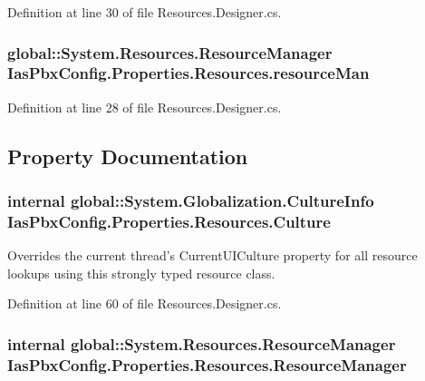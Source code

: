 Definition at line 30 of file Resources.Designer.cs.\hypertarget{class_ias_pbx_config_1_1_properties_1_1_resources_a250bf1e5d02bc97bafed037698f69671}{
\subsubsection[{resourceMan}]{\setlength{\rightskip}{0pt plus 5cm}global::System.Resources.ResourceManager {\bf IasPbxConfig.Properties.Resources.resourceMan}}}
\label{class_ias_pbx_config_1_1_properties_1_1_resources_a250bf1e5d02bc97bafed037698f69671}


Definition at line 28 of file Resources.Designer.cs.

\subsection{Property Documentation}
\hypertarget{class_ias_pbx_config_1_1_properties_1_1_resources_ac86b17b0b60450ffd58d31386fc4fa3b}{
\subsubsection[{Culture}]{\setlength{\rightskip}{0pt plus 5cm}internal global::System.Globalization.CultureInfo IasPbxConfig.Properties.Resources.Culture}}
\label{class_ias_pbx_config_1_1_properties_1_1_resources_ac86b17b0b60450ffd58d31386fc4fa3b}


Overrides the current thread's CurrentUICulture property for all resource lookups using this strongly typed resource class. 

Definition at line 60 of file Resources.Designer.cs.\hypertarget{class_ias_pbx_config_1_1_properties_1_1_resources_a227e9f96e2941625af56707a2ee7e84d}{
\subsubsection[{ResourceManager}]{\setlength{\rightskip}{0pt plus 5cm}internal global::System.Resources.ResourceManager IasPbxConfig.Properties.Resources.ResourceManager}}
\label{class_ias_pbx_config_1_1_properties_1_1_resources_a227e9f96e2941625af56707a2ee7e84d}


